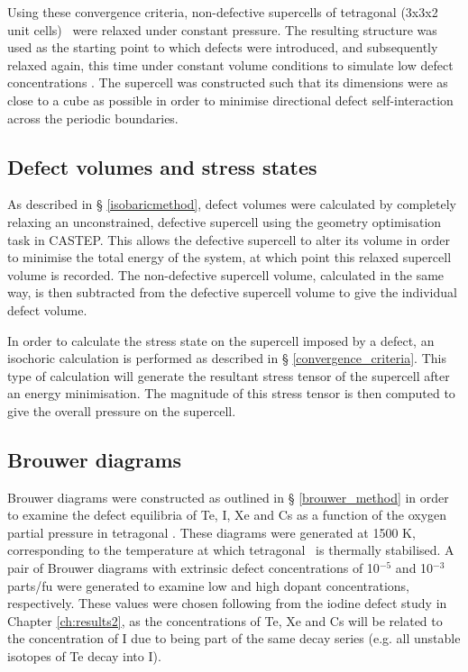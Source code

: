 Using these convergence criteria, non-defective supercells of tetragonal (3x3x2 unit cells) \zirconia\ were relaxed under constant pressure. The resulting structure was used as the starting point to which defects were introduced, and subsequently relaxed again, this time under constant volume conditions to simulate low defect concentrations \cite{Murphy2014, Bell2015}. The supercell was constructed such that its dimensions were as close to a cube as possible in order to minimise directional defect self-interaction across the periodic boundaries. 

\subsection{Defect volumes and stress states}

As described in § \ref{isobaricmethod}, defect volumes were calculated by completely relaxing an unconstrained, defective supercell using the geometry optimisation task in CASTEP. This allows the defective supercell to alter its volume in order to minimise the total energy of the system, at which point this relaxed supercell volume is recorded. The non-defective supercell volume, calculated in the same way, is then subtracted from the defective supercell volume to give the individual defect volume. 

In order to calculate the stress state on the supercell imposed by a defect, an isochoric calculation is performed as described in § \ref{convergence_criteria}. This type of calculation will generate the resultant stress tensor of the supercell after an energy minimisation. The magnitude of this stress tensor is then computed to give the overall pressure on the supercell. %

\subsection{Brouwer diagrams}

Brouwer diagrams were constructed as outlined in § \ref{brouwer_method} in order to examine the defect equilibria of Te, I, Xe and Cs as a function of the oxygen partial pressure in tetragonal \zirconia . These diagrams were generated at 1500 K, corresponding to the temperature at which tetragonal \zirconia\ is thermally stabilised. A pair of Brouwer diagrams with extrinsic defect concentrations of 10$^{-5}$ and 10$^{-3}$ parts/fu were generated to examine low and high dopant concentrations, respectively. These values were chosen following from the iodine defect study in Chapter \ref{ch:results2}, as the concentrations of Te, Xe and Cs will be related to the concentration of I due to being part of the same decay series (e.g. all unstable isotopes of Te decay into I).

